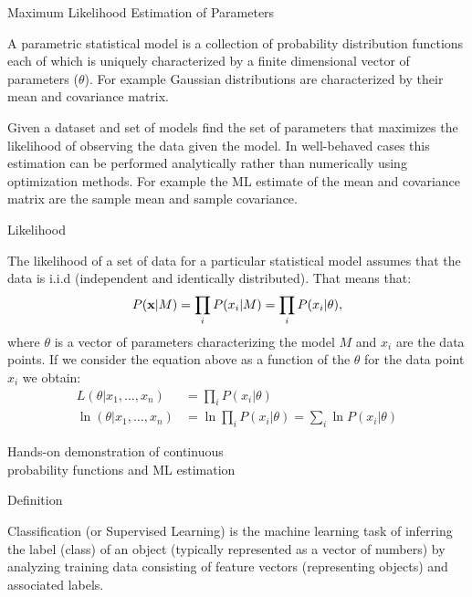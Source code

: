 \documentclass[12pt]{beamer}
\begin{document}
\begin{frame}{Maximum Likelihood Estimation of Parameters} 
\begin{definition} 
A parametric statistical model is a collection of probability distribution functions each of which is uniquely characterized by a finite dimensional vector of parameters ($\theta$). 
For example Gaussian distributions are characterized by their mean and covariance matrix. 
\end{definition}

\begin{definition}
Given a dataset and set of models find the set of parameters that
maximizes the likelihood of observing the data given the model. In
well-behaved cases this estimation can be performed analytically
rather than numerically using optimization methods. For example the ML
estimate of the mean and covariance matrix are the sample mean and
sample covariance.
\end{definition}
\end{frame}

\begin{frame}{Likelihood} 
\begin{definition} 
The likelihood of a set of data for a particular statistical model assumes that the data is i.i.d (independent and identically distributed). That means that: 
\begin{equation} 
P({\bf x}| M) = \prod_{i}P(x_i | M) = \prod_{i}P(x_i | \theta),
\end{equation} 
\noindent 
where $\theta$ is a vector of parameters characterizing the model $M$
and $x_i$ are the data points. If we consider the equation above as a
function of the $\theta$ for the data point $x_i$ we obtain:
\begin{eqnarray} 
L(\theta | x_1, \dots, x_n) &= \prod_{i}P(x_i | \theta) \\ 
\ln{(\theta | x_1, \dots, x_n)} &= \ln{\prod_{i}P(x_i | \theta)} = \sum_{i} \ln{P(x_i | \theta)}
\end{eqnarray} 
\end{definition}
\end{frame} 



\begin{frame}{Hands-on demonstration of continuous \\ probability
    functions and ML estimation}
\end{frame} 


\begin{frame}{Definition} 
\begin{definition}

Classification (or Supervised Learning) is the machine learning task
of inferring the label (class) of an object (typically represented as
a vector of numbers) by analyzing training data consisting of feature
vectors (representing objects) and associated labels.
\end{definition}
\end{frame} 
\end{document}
